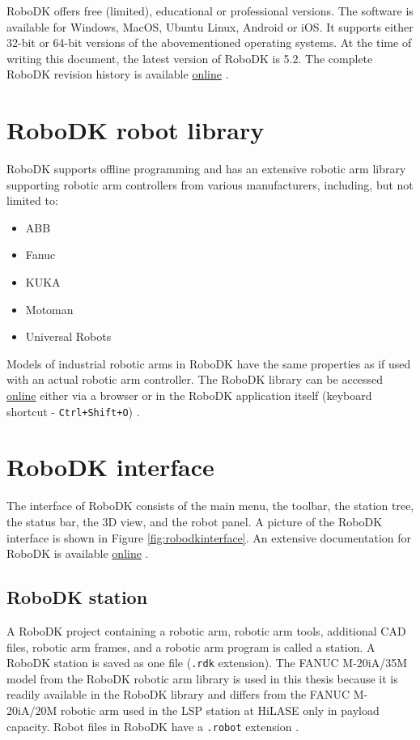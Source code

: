 RoboDK offers free (limited), educational or professional versions. 
The software is available for Windows, MacOS, Ubuntu Linux, Android or iOS. It supports either 32-bit or 64-bit versions of the abovementioned operating systems. At the time of writing this document, the latest version of RoboDK is 5.2. The complete RoboDK revision history is available \href{https://robodk.com/whatsnew}{online} \cite{robodkversions}. 

\section{RoboDK robot library}

RoboDK supports offline programming and has an extensive robotic arm library supporting robotic arm controllers from various manufacturers, including, but not limited to:

\begin{itemize}
    \item ABB 
    \item Fanuc 
    \item KUKA 
    \item Motoman 
    \item Universal Robots 
\end{itemize}
Models of industrial robotic arms in RoboDK have the same properties as if used with an actual robotic arm controller. The RoboDK library can be accessed \href{https://robodk.com/library}{online} either via a browser or in the RoboDK application itself (keyboard shortcut - \texttt{Ctrl+Shift+O}) \cite{robodklibrary}.


\section{RoboDK interface}

The interface of RoboDK consists of the main menu, the toolbar, the station tree, the status bar, the 3D view, and the robot panel. A picture of the RoboDK interface is shown in Figure \ref{fig:robodkinterface}. An extensive documentation for RoboDK is available \href{https://robodk.com/doc/en/Basic-Guide.html#Start}{online} \cite{robodkinterface}.

\subsection{RoboDK station}

A RoboDK project containing a robotic arm, robotic arm tools, additional CAD files, robotic arm frames, and a robotic arm program is called a station. A RoboDK station is saved as one file (\texttt{.rdk} extension).  The FANUC M-20iA/35M model from the RoboDK robotic arm library is used in this thesis because it is readily available in the RoboDK library and differs from the FANUC M-20iA/20M robotic arm used in the LSP station at HiLASE only in payload capacity. Robot files in RoboDK have a \texttt{.robot} extension \cite{robodkstation}.

